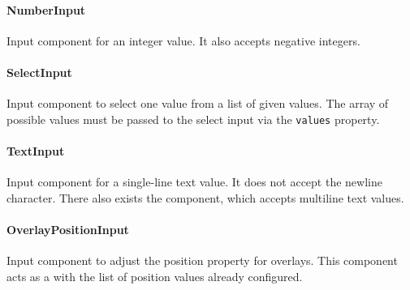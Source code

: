 \paragraph{NumberInput}
\label{sec:component-number-input}
Input component for an integer value. 
It also accepts negative integers.

\paragraph{SelectInput}
\label{sec:component-select-input}
Input component to select one value from a list of given values. 
The array of possible values must be passed to the select input via the \texttt{values} property.

\paragraph{TextInput}
\label{sec:component-text-input}
Input component for a single-line text value. 
It does not accept the newline character. 
There also exists the  component, which accepts multiline text values.

\paragraph{OverlayPositionInput}
\label{sec:component-overlay-position-input}
Input component to adjust the position property for overlays. 
This component acts as a  with the list of position values already configured.
